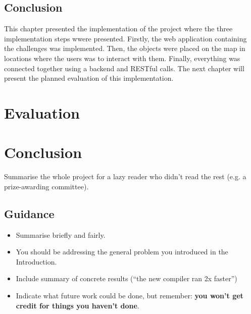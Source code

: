 \documentclass{l4proj}
\begin{document}
\section{Conclusion}

This chapter presented the implementation of the project where the three implementation steps wwere presented. 
Firstly, the web application containing the challenges was implemented.
Then, the objects were placed on the map in locations where the users was to interact with them.
Finally, everything was connected together using a backend and RESTful calls.
The next chapter will present the planned evaluation of this implementation.

\chapter{Evaluation} 



\chapter{Conclusion}    
Summarise the whole project for a lazy reader who didn't read the rest (e.g. a prize-awarding committee).
\section{Guidance}
\begin{itemize}
    \item
        Summarise briefly and fairly.
    \item
        You should be addressing the general problem you introduced in the
        Introduction.        
    \item
        Include summary of concrete results (``the new compiler ran 2x
        faster'')
    \item
        Indicate what future work could be done, but remember: \textbf{you
        won't get credit for things you haven't done}.
\end{itemize}

%
% 
\end{document}
